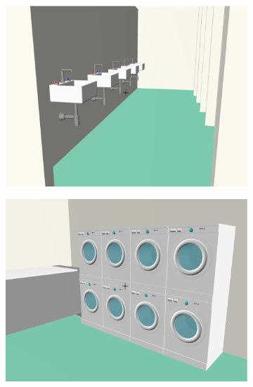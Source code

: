 \documentclass[]{egpubl}
\begin{document}
\begin{figure}[htbp]
\begin{subfigure}[b]{0.165\textwidth}
   \includegraphics[width=\textwidth]{images/emergency/10}
   \end{subfigure}
\hspace{-1.5mm}   
   \begin{subfigure}[b]{0.165\textwidth}
   \includegraphics[width=\textwidth]{images/emergency/11}
   \end{subfigure}
\hspace{-1.5mm}   
   \begin{subfigure}[b]{0.165\textwidth}

\end{subfigure}
\end{figure}
\end{document}

